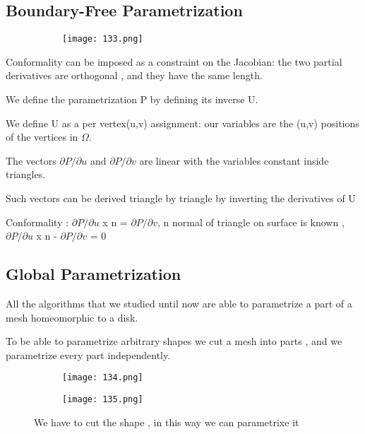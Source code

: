 \documentclass{article}
\begin{document}
\subsection{Boundary-Free Parametrization}

    \begin{figure}[ht!]
  \centering
  \begin{subfigure}[b]{0.6\linewidth}
    \texttt{[image: 133.png]}
  \end{subfigure}
\end{figure}

Conformality can be imposed as a constraint on the Jacobian: the two partial derivatives are orthogonal , and they have the same length.

We define the parametrization P by defining its inverse U.

We define U as a per vertex(u,v) assignment: our variables are the (u,v) positions of the vertices in $\Omega$.

The vectors $\partial P/\partial u$ and  $\partial P/\partial v$ are linear with the variables constant inside triangles.

Such vectors can be derived triangle by triangle by inverting the derivatives of U

Conformality : $\partial P/\partial u$ x n = $\partial P/\partial v$, n normal of triangle on surface is known ,  $\partial P/\partial u$ x n - $\partial P/\partial v$ = 0

\subsection{Global Parametrization}

All the algorithms that we studied until now are able to parametrize a part of a mesh homeomorphic to a disk.

To be able to parametrize arbitrary shapes we cut a mesh into parts , and we parametrize every part independently.

    \begin{figure}[ht!]
  \centering
  \begin{subfigure}[b]{0.7\linewidth}
    \texttt{[image: 134.png]}
  \end{subfigure}
\end{figure}

    \begin{figure}[ht!]
  \centering
  \begin{subfigure}[b]{0.7\linewidth}
    \texttt{[image: 135.png]}
  \end{subfigure}
  \caption{We have to cut the shape , in this way we can parametrixe it}
\end{figure}
\end{document}
